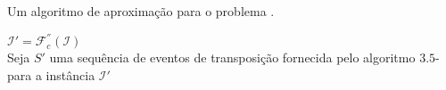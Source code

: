 \begin{algorithm}[!tbh]
  \caption{Um algoritmo de aproximação para o problema \SbFIT{}.\label{algorithm:UMNIXZHY}}
  $\mathcal{I}' = \mathcal{F}_{c}^{''}(\mathcal{I})$ \\
  Seja $S'$ uma sequência de eventos de transposição fornecida pelo algoritmo $3.5$-\SbIT{} para a instância $\mathcal{I}'$ \\
\end{algorithm}